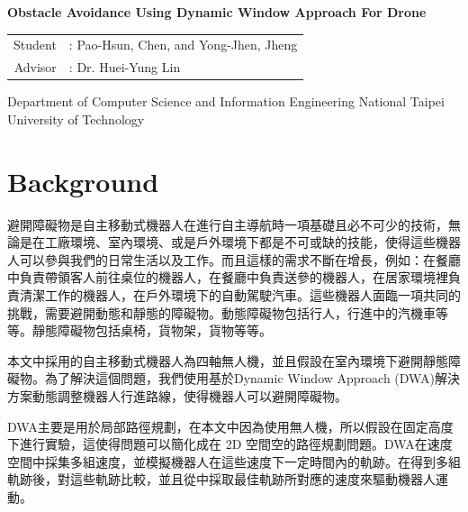 \documentclass[12pt, a4paper, oneside]{article}
\newcommand{\englishTitle}{Obstacle Avoidance Using Dynamic Window Approach For Drone}
\newcommand{\studentEnName}{Pao-Hsun, Chen, and Yong-Jhen, Jheng}
\newcommand{\advisorEnName}{Huei-Yung Lin}
\begin{document}
	
	\begin{titlepage}
		\begin{center}
			\LARGE
			\begin{singlespace}
				\textbf{\englishTitle{}} \\[0.5cm]
			\end{singlespace}
			
			\begin{singlespace}
				\begin{tabular}{r l}
					Student     & : \studentEnName{}  \\
					Advisor  & : Dr. \advisorEnName{} \\[0.5cm]
				\end{tabular}
			\end{singlespace}
			
			\begin{singlespace}
				Department of Computer Science
				and Information Engineering
				National Taipei University of Technology\\[0.5cm]
			\end{singlespace}
			
		\end{center}
	\end{titlepage}
	
	\section{Background}
     避開障礙物是自主移動式機器人在進行自主導航時一項基礎且必不可少的技術，無論是在工廠環境、室內環境、或是戶外環境下都是不可或缺的技能，使得這些機器人可以參與我們的日常生活以及工作。而且這樣的需求不斷在增長，例如：在餐廳中負責帶領客人前往桌位的機器人，在餐廳中負責送參的機器人，在居家環境裡負責清潔工作的機器人，在戶外環境下的自動駕駛汽車。這些機器人面臨一項共同的挑戰，需要避開動態和靜態的障礙物。動態障礙物包括行人，行進中的汽機車等等。靜態障礙物包括桌椅，貨物架，貨物等等。
     
     本文中採用的自主移動式機器人為四軸無人機，並且假設在室內環境下避開靜態障礙物。為了解決這個問題，我們使用基於Dynamic Window Approach (DWA)解決方案動態調整機器人行進路線，使得機器人可以避開障礙物。
     
     DWA主要是用於局部路徑規劃，在本文中因為使用無人機，所以假設在固定高度下進行實驗，這使得問題可以簡化成在 2D 空間空的路徑規劃問題。DWA在速度空間中採集多組速度，並模擬機器人在這些速度下一定時間內的軌跡。在得到多組軌跡後，對這些軌跡比較，並且從中採取最佳軌跡所對應的速度來驅動機器人運動。
\end{document}
